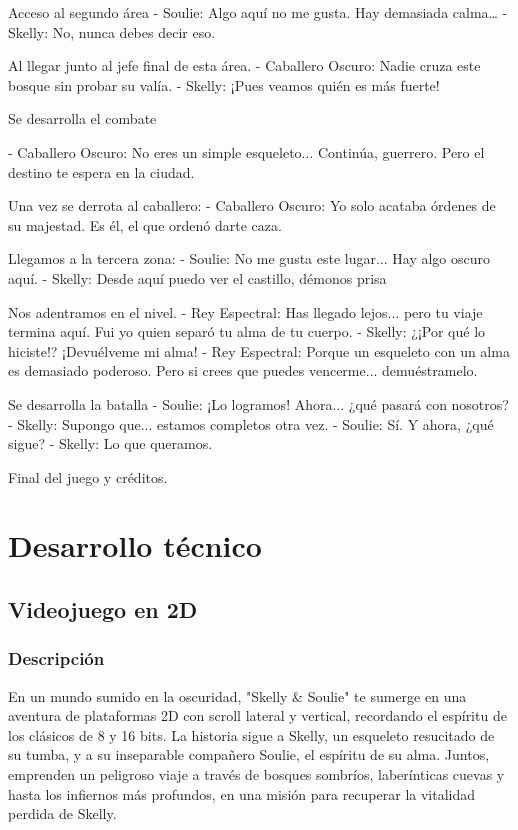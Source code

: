 \documentclass[12pt,a4paper,twoside,spanish]{article}      %
\begin{document}
Acceso al segundo área 
- Soulie: Algo aquí no me gusta. Hay demasiada calma…
- Skelly: No, nunca debes decir eso.

Al llegar junto al jefe final de esta área.
- Caballero Oscuro: Nadie cruza este bosque sin probar su valía.
- Skelly: ¡Pues veamos quién es más fuerte!

Se desarrolla el combate 

- Caballero Oscuro:  No eres un simple esqueleto... Continúa, guerrero. Pero el destino te espera en la ciudad.

Una vez se derrota al caballero:
- Caballero Oscuro:  Yo solo acataba órdenes de su majestad. Es él, el que ordenó darte caza.

Llegamos a la tercera zona:
- Soulie: No me gusta este lugar... Hay algo oscuro aquí.
- Skelly: Desde aquí puedo ver el castillo, démonos prisa

Nos adentramos en el nivel.
- Rey Espectral: Has llegado lejos... pero tu viaje termina aquí. Fui yo quien separó tu alma de tu cuerpo.
- Skelly: ¿¡Por qué lo hiciste!? ¡Devuélveme mi alma!
- Rey Espectral: Porque un esqueleto con un alma es demasiado poderoso. Pero si crees que puedes vencerme... demuéstramelo.

Se desarrolla la batalla
- Soulie:  ¡Lo logramos! Ahora... ¿qué pasará con nosotros?
- Skelly:  Supongo que... estamos completos otra vez.
- Soulie: Sí. Y ahora, ¿qué sigue?
- Skelly:  Lo que queramos.

Final del juego y créditos.

\clearpage

\section{Desarrollo técnico}

\subsection{Videojuego en 2D}

\subsubsection{Descripción}

En un mundo sumido en la oscuridad, "Skelly & Soulie" te sumerge en una aventura de plataformas 2D con scroll lateral y vertical, recordando el espíritu de los clásicos de 8 y 16 bits. La historia sigue a Skelly, un esqueleto resucitado de su tumba, y a su inseparable compañero Soulie, el espíritu de su alma. Juntos, emprenden un peligroso viaje a través de bosques sombríos, laberínticas cuevas y hasta los infiernos más profundos, en una misión para recuperar la vitalidad perdida de Skelly.\\
\end{document}
